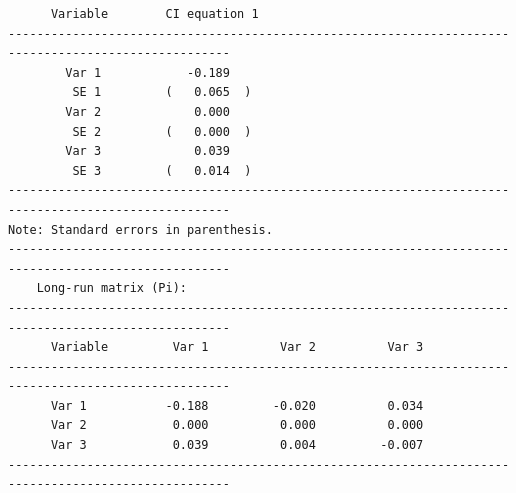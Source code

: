 \documentclass[10pt]{article}
\begin{document}
\begin{verbatim}
      Variable        CI equation 1  
-----------------------------------------------------------------------------------------------------
        Var 1            -0.189     
         SE 1         (   0.065  )  
        Var 2             0.000     
         SE 2         (   0.000  )  
        Var 3             0.039     
         SE 3         (   0.014  )  
-----------------------------------------------------------------------------------------------------
Note: Standard errors in parenthesis.                                                                
-----------------------------------------------------------------------------------------------------
    Long-run matrix (Pi):                                                                       
-----------------------------------------------------------------------------------------------------
      Variable         Var 1          Var 2          Var 3   
-----------------------------------------------------------------------------------------------------
      Var 1           -0.188         -0.020          0.034    
      Var 2            0.000          0.000          0.000    
      Var 3            0.039          0.004         -0.007    
-----------------------------------------------------------------------------------------------------


\end{verbatim}
\end{document}
